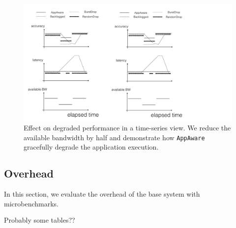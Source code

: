\begin{figure}
  \centering
  \includegraphics[width=.95\linewidth]{figures/degrade-placeholder-2.pdf}
  \caption{Effect on degraded performance in a time-series view. We reduce the
    available bandwidth by half and demonstrate how \texttt{AppAware} gracefully
    degrade the application execution.}
  \label{fig:degrade-ts}
\end{figure}

\subsection{Overhead}
\label{sec:overhead}

In this section, we evaluate the overhead of the base system with
microbenchmarks.

Probably some tables??

